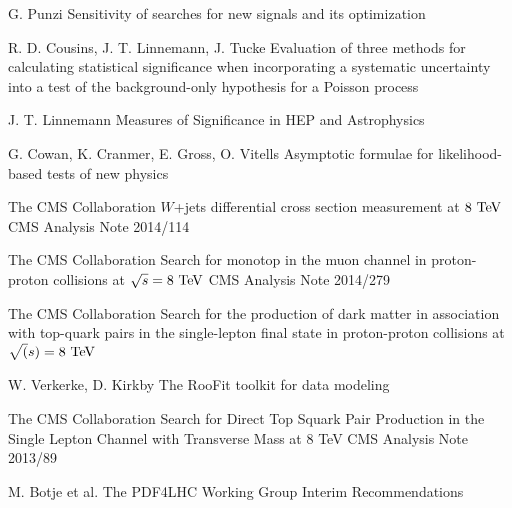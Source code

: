 \begin{thebibliography}{2}
             {G. Punzi}
             {Sensitivity of searches for new signals and its optimization}
             {}

             {R. D. Cousins, J. T. Linnemann, J. Tucke}
             {Evaluation of three methods for calculating
             statistical significance when incorporating a
             systematic uncertainty into a test of the
             background-only hypothesis for a Poisson
             process}
             {}

             {J. T. Linnemann}
             {Measures of Significance in HEP and Astrophysics}
             {}

             {G. Cowan, K. Cranmer, E. Gross, O. Vitells}
             {Asymptotic formulae for likelihood-based tests of new physics}
             {}


             {The CMS Collaboration}
             {$W$+jets differential cross section measurement at $8~\text{TeV}$}
             {CMS Analysis Note 2014/114}

             {The CMS Collaboration}
             {Search for monotop in the muon channel in proton-proton collisions at $\sqrt{s} = 8~\text{TeV}$}
             {CMS Analysis Note 2014/279}

             {The CMS Collaboration}
             {Search for the production of dark matter in association with top-quark pairs
             in the single-lepton final state in proton-proton collisions at $\sqrt(s) = 8~\text{TeV}$}
             {}

             {W. Verkerke, D. Kirkby}
             {The RooFit toolkit for data modeling}
             {}


             {The CMS Collaboration}
             {Search for Direct Top Squark Pair Production in the Single Lepton Channel
             with Transverse Mass at 8 TeV}
             {CMS Analysis Note 2013/89}

             {M. Botje et al.}
             {The PDF4LHC Working Group Interim Recommendations}
             {}


\end{thebibliography}
